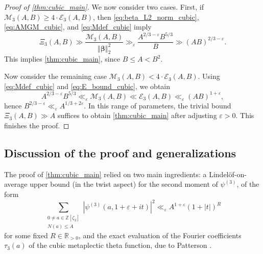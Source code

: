 \documentclass[12pt,reqno]{amsart}
\numberwithin{equation}{section}
\newcommand\norm[1]{\left\Vert {#1} \right\Vert}
\newcommand{\R}{\mathbb{R}}
\begin{document}
\begin{proof}[Proof of \cref{thm:cubic_main}]
    We now consider two cases. First, if $\mathcal{M}_3(A, B) \geq 4 \cdot \mathcal{E}_3(A, B)$, then \eqref{eq:beta_L2_norm_cubic}, \eqref{eq:AMGM_cubic}, and \eqref{eq:Mdef_cubic} imply
    \begin{equation*}
        \Xi_3(A, B) \gg \frac{\mathcal{M}_3(A, B)}{\norm{\boldsymbol{\beta}}_2^2} \gg_\varepsilon \frac{A^{2/3 - \varepsilon} B^{5/3}}{B} \gg (AB)^{2/3-\varepsilon}.
    \end{equation*}
    This implies \cref{thm:cubic_main}, since $B \leq A < B^2$. 
    
    Now consider the remaining case $\mathcal{M}_3(A, B) < 4 \cdot \mathcal{E}_3(A, B)$. Using \eqref{eq:Mdef_cubic} and \eqref{eq:E_bound_cubic}, we obtain
    \begin{equation*}
        A^{2/3 - \varepsilon} B^{5/3} \ll_\varepsilon \mathcal{M}_3(A, B) \ll \mathcal{E}_3(A, B) \ll_\varepsilon (AB)^{1+\varepsilon},
    \end{equation*}
    hence $B^{2/3-\varepsilon} \ll_\varepsilon A^{1/3+2\varepsilon}$. In this range of parameters, the trivial bound $\Xi_3(A, B) \gg A$ suffices to obtain \cref{thm:cubic_main} after adjusting $\varepsilon > 0$. This finishes the proof.
\end{proof}

\subsection{Discussion of the proof and generalizations}

The proof of \cref{thm:cubic_main} relied on two main ingredients: a Lindel\"{o}f-on-average upper bound (in the twist aspect) for the second moment of $\psi^{(3)}$, of the form 
\begin{equation}\label{eq:second_moment}
    \sum_{\substack{0 \neq a \in \mathbb{Z}[\zeta_3] \\ N(a) \leq A}} |{\psi^{(3)}(a, 1 + \varepsilon +it)}|^2 \ll_\varepsilon A^{1+\varepsilon} (1+|{t}|)^{R}
\end{equation}
for some fixed $R \in \R_{>0}$, and the exact evaluation of the Fourier coefficients $\tau_3(a)$ of the cubic metaplectic theta function, due to Patterson \cite[Theorem~8.1]{Pat1}. 
\end{document}
